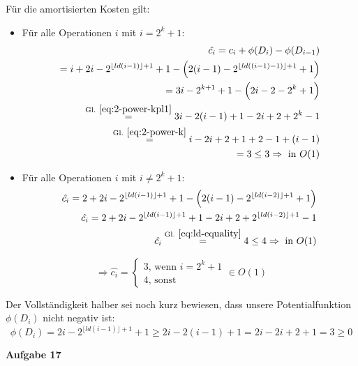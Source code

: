 \documentclass{article}
\begin{document}
Für die amortisierten Kosten gilt: 
\begin{itemize}
  \item Für alle Operationen $i$ mit $i=2^k+1$:\\
    \begin{align*}
    \hat{c_i} = c_i + \phi(D_i) - \phi(D_{i-1}) \\
    = i + 2i - 2^{\lfloor ld(i - 1) \rfloor + 1} + 1 - \left( 2(i - 1) - 2^{\lfloor ld((i - 1) - 1) \rfloor + 1} + 1 \right) \\
    = 3i - 2^{k + 1} + 1 - \left( 2i - 2 - 2^k + 1 \right) \\
    \stackrel{\mathrm{Gl.~\ref{eq:2-power-kpl1}}}= 3i - 2(i - 1) + 1 - 2i + 2 + 2^k - 1 \\
    \stackrel{\mathrm{Gl.~\ref{eq:2-power-k}}}= i - 2i + 2 + 1 + 2 - 1 + (i - 1) \\
    = 3 \leq 3 \Rightarrow\text{ in }O(1)
    \end{align*}
  \item Für alle Operationen $i$ mit $i\neq2^k+1$:\\
    \begin{align*}
    \hat{c_i} = 2 + 2i - 2^{\lfloor ld(i - 1) \rfloor + 1} + 1 - \left( 2(i - 1) - 2^{\lfloor ld(i - 2) \rfloor + 1} + 1 \right) \\
    \hat{c_i} = 2 + 2i - 2^{\lfloor ld(i - 1) \rfloor + 1} + 1 - 2i + 2 + 2^{\lfloor ld(i - 2) \rfloor + 1} - 1 \\
    \hat{c_i} \stackrel{\mathrm{Gl.~\ref{eq:ld-equality}}}= 4 \leq 4 \Rightarrow\text{ in }O(1)
    \end{align*}
\end{itemize}

\begin{equation}
\Longrightarrow \hat{c_i} = \begin{cases}3\text{, wenn }i = 2^k + 1 \\ 4\text{, sonst}\end{cases}\in O(1)
\end{equation}

Der Vollst{\"a}ndigkeit halber sei noch kurz bewiesen, dass unsere
Potentialfunktion $\phi(D_i)$ nicht negativ ist:
\begin{equation}
  \phi(D_i) = 2i - 2^{\lfloor ld(i - 1) \rfloor + 1} + 1 \geq 2i - 2(i - 1) + 1 = 2i - 2i + 2 + 1 = 3 \geq 0
\end{equation}


{\bfseries Aufgabe 17}%
\end{document}
